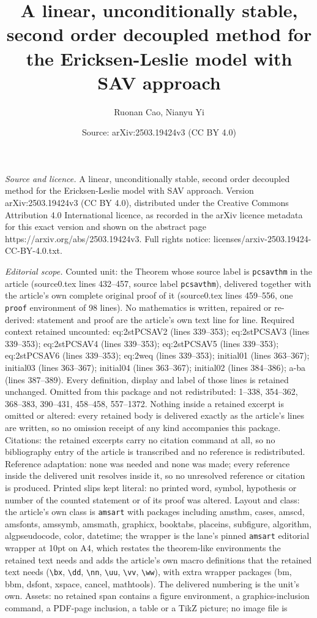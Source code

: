 \documentclass[10pt,a4paper]{amsart}
\title[A linear, unconditionally stable, second order decoupled met]{A linear, unconditionally stable, second order decoupled method for the Ericksen-Leslie model with SAV approach}
\author{Ruonan Cao, Nianyu Yi}
\date{Source: arXiv:2503.19424v3 (CC BY 4.0)}
\begin{document}
\maketitle

\noindent\emph{Source and licence.} A linear, unconditionally stable, second order decoupled method for the Ericksen-Leslie model with SAV approach. Version arXiv:2503.19424v3 (CC BY 4.0), distributed under the Creative Commons Attribution 4.0 International licence, as recorded in the arXiv licence metadata for this exact version and shown on the abstract page https://arxiv.org/abs/2503.19424v3. Full rights notice: licenses/arxiv-2503.19424-CC-BY-4.0.txt.\par\smallskip

\noindent\textit{Editorial scope.} Counted unit: the Theorem whose source label is \texttt{pcsavthm} in the article (source0.tex lines 432--457, source label \texttt{pcsavthm}), delivered together with the article's own complete original proof of it (source0.tex lines 459--556, one \texttt{proof} environment of 98 lines). No mathematics is written, repaired or re-derived: statement and proof are the article's own text line for line. Required context retained uncounted: eq:2stPCSAV2 (lines 339--353); eq:2stPCSAV3 (lines 339--353); eq:2stPCSAV4 (lines 339--353); eq:2stPCSAV5 (lines 339--353); eq:2stPCSAV6 (lines 339--353); eq:2weq (lines 339--353); initial01 (lines 363--367); initial03 (lines 363--367); initial04 (lines 363--367); initial02 (lines 384--386); a-ba (lines 387--389). Every definition, display and label of those lines is retained unchanged. Omitted from this package and not redistributed: 1--338, 354--362, 368--383, 390--431, 458--458, 557--1372. Nothing inside a retained excerpt is omitted or altered: every retained body is delivered exactly as the article's lines are written, so no omission receipt of any kind accompanies this package. Citations: the retained excerpts carry no citation command at all, so no bibliography entry of the article is transcribed and no reference is redistributed. Reference adaptation: none was needed and none was made; every reference inside the delivered unit resolves inside it, so no unresolved reference or citation is produced. Printed slips kept literal: no printed word, symbol, hypothesis or number of the counted statement or of its proof was altered. Layout and class: the article's own class is \texttt{amsart} with packages including amsthm, cases, amscd, amsfonts, amssymb, amsmath, graphicx, booktabs, placeins, subfigure, algorithm, algpseudocode, color, datetime; the wrapper is the lane's pinned \texttt{amsart} editorial wrapper at 10pt on A4, which restates the theorem-like environments the retained text needs and adds the article's own macro definitions that the retained text needs (\texttt{\textbackslash bx}, \texttt{\textbackslash dd}, \texttt{\textbackslash nn}, \texttt{\textbackslash uu}, \texttt{\textbackslash vv}, \texttt{\textbackslash ww}), with extra wrapper packages (bm, bbm, dsfont, xspace, cancel, mathtools). The delivered numbering is the unit's own. Assets: no retained span contains a figure environment, a graphics-inclusion command, a PDF-page inclusion, a table or a TikZ picture; no image file is 
\end{document}
